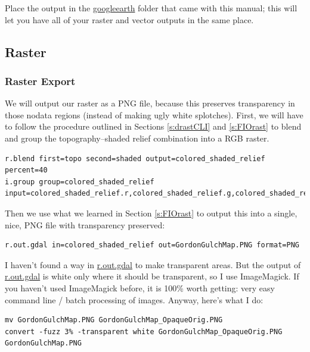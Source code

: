 \documentclass{book}
\begin{document}
Place the output in the \url{googleearth} folder that came with this manual; this will let you have all of your raster and vector outputs in the same place.

\subsection{Raster}

\subsubsection{Raster Export}

We will output our raster as a PNG file, because this preserves transparency in those nodata regions (instead of making ugly white splotches). First, we will have to follow the procedure outlined in Sections \ref{s:drastCLI} and \ref{s:FIOrast} to blend and group the topography--shaded relief combination into a RGB raster.
\begin{lstlisting}
r.blend first=topo second=shaded output=colored_shaded_relief percent=40
i.group group=colored_shaded_relief input=colored_shaded_relief.r,colored_shaded_relief.g,colored_shaded_relief.b
\end{lstlisting}

Then we use what we learned in Section \ref{s:FIOrast} to output this into a single, nice, PNG file with transparency preserved:
\begin{lstlisting}
r.out.gdal in=colored_shaded_relief out=GordonGulchMap.PNG format=PNG
\end{lstlisting}

I haven't found a way in \url{r.out.gdal} to make transparent areas. But the output of \url{r.out.gdal} is white only where it should be transparent, so I use ImageMagick. If you haven't used ImageMagick before, it is 100\% worth getting: very easy command line / batch processing of images. Anyway, here's what I do:
\begin{lstlisting}
mv GordonGulchMap.PNG GordonGulchMap_OpaqueOrig.PNG
convert -fuzz 3% -transparent white GordonGulchMap_OpaqueOrig.PNG GordonGulchMap.PNG
\end{lstlisting}
\end{document}
